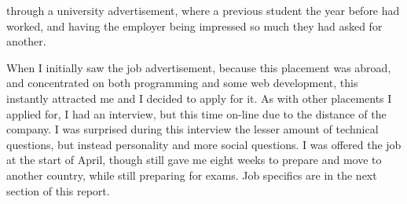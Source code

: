 \documentclass[12pt]{article}
\begin{document}
through a university advertisement, where a previous student the year before had worked, and having the employer being
impressed so much they had asked for another.\\ \par\noindent
When I initially saw the job advertisement, because this placement was abroad, and concentrated on both programming and
some web development, this instantly attracted me and I decided to apply for it. As with other placements I applied for,
I had an interview, but this time on-line due to the distance of the company. I was surprised during this interview the
lesser amount of technical questions, but instead personality and more social questions. I was offered the job at
the start of April, though still gave me eight weeks to prepare and move to another country, while still
preparing for exams. Job specifics are in the next section of this report.

\end{document}
